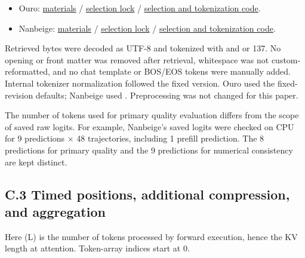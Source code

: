 \documentclass[10pt,a4paper]{article}
\newcommand{\tightlist}{\setlength{\itemsep}{1pt}\setlength{\parskip}{0pt}}
\begin{document}
\begin{itemize}
\tightlist
\item
  Ouro: \href{https://github.com/metaSATOKEN/nsn/blob/c37d39ea0106274d9f661cfbb268b0ed05319846/runs/loop-kv-ac08-20261002-095022-41c2554c/materials.json}{materials} / \href{https://github.com/metaSATOKEN/nsn/blob/c37d39ea0106274d9f661cfbb268b0ed05319846/runs/loop-kv-ac08-20261002-095022-41c2554c/selection_lock.json}{selection lock} / \href{https://github.com/metaSATOKEN/nsn/blob/c37d39ea0106274d9f661cfbb268b0ed05319846/scripts/loop_kv_ac08_materials.py}{selection and tokenization code}.
\item
  Nanbeige: \href{https://github.com/metaSATOKEN/nsn/blob/c37d39ea0106274d9f661cfbb268b0ed05319846/runs/loop-kv-nb05-20261003-090604-18baabf5/materials.json}{materials} / \href{https://github.com/metaSATOKEN/nsn/blob/c37d39ea0106274d9f661cfbb268b0ed05319846/runs/loop-kv-nb05-20261003-090604-18baabf5/selection_lock.json}{selection lock} / \href{https://github.com/metaSATOKEN/nsn/blob/c37d39ea0106274d9f661cfbb268b0ed05319846/scripts/loop_kv_nb05_materials.py}{selection and tokenization code}.
\end{itemize}

Retrieved bytes were decoded as UTF-8 and tokenized with \texttt{} and \texttt{} or 137. No opening or front matter was removed after retrieval, whitespace was not custom-reformatted, and no chat template or BOS/EOS tokens were manually added. Internal tokenizer normalization followed the fixed version. Ouro used the fixed-revision \texttt{} defaults; Nanbeige used \texttt{}. Preprocessing was not changed for this paper.

The number of tokens used for primary quality evaluation differs from the scope of saved raw logits. For example, Nanbeige's saved logits were checked on CPU for 9 predictions × 48 trajectories, including 1 prefill prediction. The 8 predictions for primary quality and the 9 predictions for numerical consistency are kept distinct.

\subsection{C.3 Timed positions, additional compression, and aggregation}\label{c.3-timed-positions-additional-compression-and-aggregation}

Here (L) is the number of tokens processed by forward execution, hence the KV length at attention. Token-array indices start at 0.
\end{document}
